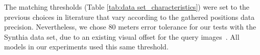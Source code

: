 \documentclass[letterpaper, 10 pt, conference]{ieeeconf}  %
\begin{document}
The matching thresholds (Table \ref{tab:data set_characteristics}) were set to the previous choices in literature that vary according to the gathered positions data precision. Nevertheless, we chose 80 meters error tolerance for our tests with the Synthia data set, due to an existing visual offset for the query images~\cite{tolerance_synthia}.  All models in our experiments used this same threshold.






\end{document}
